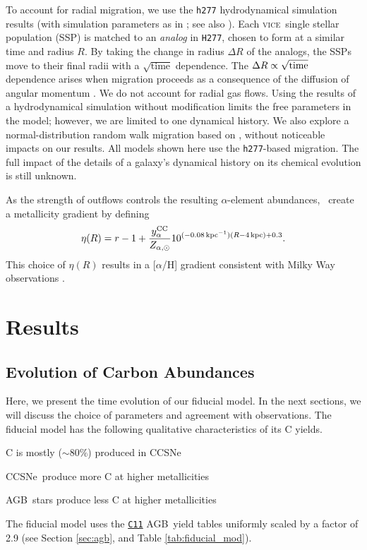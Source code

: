 \documentclass[fleqn,usenatbib]{mnras}
\newcommand{\JJ}{\citetalias{james+21}}
\newcommand{\VICE}{\textsc{vice}}
\newcommand{\cxi}{\texttt{\hyperlink{C11}{C11}}}
\newcommand{\agb}{AGB}
\newcommand{\cc}{CCSNe}
\newcommand{\about}[1]{${\sim} #1$}
\begin{document}
To account for radial migration, we use the \texttt{h277} hydrodynamical
simulation results (with simulation parameters as in \citealt{bird+21}; see also \citealt{christensen12, zolotov12, loebman12, BZ14}).  
Each \VICE\ single stellar population (SSP) is matched to an \textit{analog} in \texttt{H277}, chosen to form at a similar time and radius $R$. By taking the change in radius $\Delta R$ of the analogs, the SSPs move to their final radii with a $\sqrt{\text{time}}$ dependence.
The $\Delta R \propto \sqrt{\rm time}$ dependence arises when migration proceeds as a consequence of the diffusion of angular momentum \citep{frankel18, frankel20}.
We do not account for radial gas flows.
Using the results of a hydrodynamical simulation without modification limits the free parameters in the model; however, we are limited to one dynamical history. 
We also explore a normal-distribution random walk migration based on \citet{frankel18}, without noticeable impacts on our results. All models shown here use the \texttt{h277}-based migration. The full impact of the details of a galaxy's dynamical history on its chemical evolution is still unknown.

As the strength of outflows controls the resulting $\alpha$-element abundances, \JJ~create a metallicity gradient by defining
\begin{equation}\label{eq:eta_r}
\eta(R) = r - 1 + \frac{y_{\alpha}^{\rm CC}}{Z_{\alpha, \odot}} 10^{(-0.08\,\text{kpc}^{-1})(R-4\,\text{kpc})+0.3}.
\end{equation}
This choice of $\eta(R)$ results in a [$\alpha$/H] gradient consistent with Milky Way observations \citep[e.g.][]{hayden+14, weinberg+19, frinchaboy+13}.


\section{Results}

\subsection{Evolution of Carbon Abundances}

Here, we present the time evolution of our fiducial model. In the next sections, we will discuss the choice of parameters and agreement with observations. 
The fiducial model has the following qualitative characteristics of its C yields.
\begin{description}
    \item C is mostly (\about{80\%}) produced in \cc
    \item \cc\ produce more C at higher metallicities
    \item \agb\ stars produce less C at higher metallicities 
\end{description} 
The fiducial model uses the \cxi{} \agb\ yield tables uniformly scaled by a factor of 2.9 (see Section \ref{sec:agb}, and Table \ref{tab:fiducial_mod}). 
\end{document}
